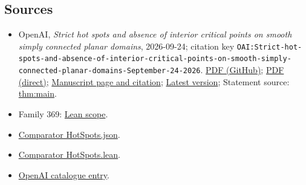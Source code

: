 \documentclass[11pt]{article}
\begin{document}
\subsection{Sources}
\begin{itemize}
\item OpenAI, \emph{Strict hot spots and absence of interior critical points on smooth simply connected planar domains}, 2026-09-24; citation key \texttt{OAI:Strict-hot-spots-and-absence-of-interior-critical-points-on-smooth-simply-connected-planar-domains-September-24-2026}. \href{https://github.com/openai/math/blob/adc7f1241b42e322a6451854ab7e4b4c146bf78a/preprints/Strict-hot-spots-and-absence-of-interior-critical-points-on-smooth-simply-connected-planar-domains-September-24-2026/main.pdf}{PDF (GitHub)}; \href{https://github.com/openai/math/raw/adc7f1241b42e322a6451854ab7e4b4c146bf78a/preprints/Strict-hot-spots-and-absence-of-interior-critical-points-on-smooth-simply-connected-planar-domains-September-24-2026/main.pdf}{PDF (direct)}; \href{https://github.com/openai/math/blob/adc7f1241b42e322a6451854ab7e4b4c146bf78a/preprints/Strict-hot-spots-and-absence-of-interior-critical-points-on-smooth-simply-connected-planar-domains-September-24-2026/README.md}{Manuscript page and citation}; \href{https://github.com/openai/math/blob/main/preprints/Strict-hot-spots-and-absence-of-interior-critical-points-on-smooth-simply-connected-planar-domains-September-24-2026/main.pdf}{Latest version}; Statement source: \href{https://github.com/openai/math/blob/adc7f1241b42e322a6451854ab7e4b4c146bf78a/preprints/Strict-hot-spots-and-absence-of-interior-critical-points-on-smooth-simply-connected-planar-domains-September-24-2026/build/sections/01-introduction.tex\#L13}{thm:main}.
\item Family 369: \href{https://github.com/openai/math/blob/adc7f1241b42e322a6451854ab7e4b4c146bf78a/lean/docs/369.md}{Lean scope}.
\item \href{https://github.com/openai/math/blob/adc7f1241b42e322a6451854ab7e4b4c146bf78a/lean/ComparatorChallenges/HotSpots.json}{Comparator HotSpots.json}.
\item \href{https://github.com/openai/math/blob/adc7f1241b42e322a6451854ab7e4b4c146bf78a/lean/ComparatorChallenges/HotSpots.lean}{Comparator HotSpots.lean}.
\item \href{https://github.com/openai/math/blob/adc7f1241b42e322a6451854ab7e4b4c146bf78a/CONTENTS.md}{OpenAI catalogue entry}.
\end{itemize}
\end{document}
